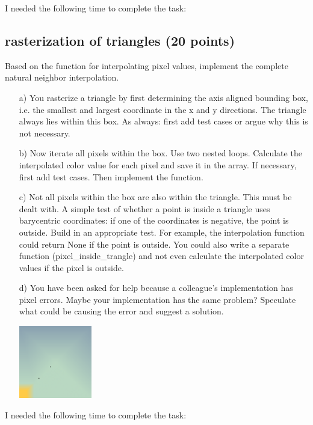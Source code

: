 I needed the following time to complete the task:

\subsection{rasterization of triangles (20 points)}

Based on the function for interpolating pixel values, implement the complete natural neighbor interpolation.

\begin{enumerate}

\item[a)] You rasterize a triangle by first determining the axis aligned bounding box, i.e. the smallest and largest coordinate in the x and y directions. The triangle always lies within this box. As always: first add test cases or argue why this is not necessary.

\item[b)] Now iterate all pixels within the box. Use two nested loops. Calculate the interpolated color value for each pixel and save it in the array. If necessary, first add test cases. Then implement the function.

\item[c)] Not all pixels within the box are also within the triangle. This must be dealt with. A simple test of whether a point is inside a triangle uses barycentric coordinates: if one of the coordinates is negative, the point is outside. Build in an appropriate test. For example, the interpolation function could return None if the point is outside. You could also write a separate function (pixel\_inside\_trangle) and not even calculate the interpolated color values if the pixel is outside.

\begin{center}
\end{center}

\item[d)] You have been asked for help because a colleague's implementation has pixel errors. Maybe your implementation has the same problem? Speculate what could be causing the error and suggest a solution.

\begin{center}
\includegraphics[width=0.25\textwidth]{source_code/example_pixel_error.png}
\end{center}

\end{enumerate}

I needed the following time to complete the task:

